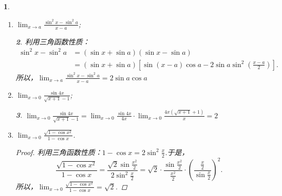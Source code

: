 \documentclass[utf8]{book}
\newtheorem{example}{}[section]             %
\newtheorem{solution}{}
\begin{document}
\begin{example}
\begin{enumerate}
\begin{solution}
$\displaystyle\lim_{x\to +\infty}x\sin{\frac{1}{x}}=\displaystyle\lim_{y\to 0^+}\frac{\sin{y}}{y}=1$.
\end{solution}
\item $\displaystyle\lim_{x\to a}\frac{\sin^2{x}-\sin^2{a}}{x-a}$;
\begin{solution}利用三角函数性质：
\begin{equation*}
\begin{split}
\sin^2{x}-\sin^2{a}&=(\sin{x}+\sin{a})(\sin{x}-\sin{a})\\
&=(\sin{x}+\sin{a})\left[\sin(x-a)\cos{a}-2\sin{a}\sin^2\left(\frac{x-a}{2}\right)\right].
\end{split}
\end{equation*}
所以，$\displaystyle\lim_{x\to a}\frac{\sin^2{x}-\sin^2{a}}{x-a}=2\sin{a}\cos{a}$
\end{solution}
\item $\displaystyle\lim_{x\to 0}\frac{\sin{4x}}{\sqrt{x+1}-1}$;
\begin{solution}
$\displaystyle\lim_{x\to 0}\frac{\sin{4x}}{\sqrt{x+1}-1}=\displaystyle\lim_{x\to 0}\frac{\sin{4x}}{4x}\cdot\displaystyle\lim_{x\to 0}\frac{4x\left(\sqrt{x+1}+1\right)}{x}=2$
\end{solution}
\item $\displaystyle\lim_{x\to 0}\frac{\sqrt{1-\cos{x^2}}}{1-\cos{x}}$.
\begin{proof}
利用三角函数性质：$1-\cos{x}=2\sin^2{\displaystyle\frac{x}{2}}$.于是，
$$\frac{\sqrt{1-\cos{x^2}}}{1-\cos{x}}=\frac{\sqrt{2}\sin{\frac{x^2}{2}}}{2\sin^2{\frac{x}{2}}}=\sqrt{2}\cdot\frac{\sin{\frac{x^2}{2}}}{\frac{x^2}{2}}\cdot\left(\frac{\frac{x}{2}}{\sin{\frac{x}{2}}}\right)^2.$$
所以，$\displaystyle\lim_{x\to 0}\frac{\sqrt{1-\cos{x^2}}}{1-\cos{x}}=\sqrt{2}$.
\end{proof}
\end{enumerate}
\end{example}
\end{document}
